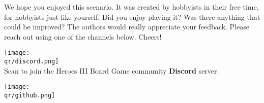 

\vspace{\baselineskip}
We hope you enjoyed this scenario.  %
It was created by hobbyists in their free time, for hobbyists just like yourself.
Did you enjoy playing it?
Was there anything that could be improved?
The authors would really appreciate your feedback.
Please reach out using one of the channels below.
Cheers!

\begin{multicols}{2}
  \bigbreak
  \centering
  \texttt{[image: \\qr/discord.png]}\\
  Scan to join the Heroes III Board Game community \textbf{Discord} server.\\
  \href{\discordurl}{\discordurl}

  \columnbreak
  \texttt{[image: \\qr/github.png]} \\
  \qrgithub \\
  \href{\repourl}{\repourl}
\end{multicols}

\vfill
\begin{center}
\end{center}
